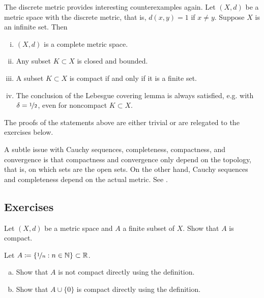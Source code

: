 \begin{example}
The discrete metric provides interesting counterexamples again.
Let $(X,d)$ be a metric space with the discrete metric, that is, $d(x,y) = 1$
if $x \neq y$.  Suppose
$X$ is an infinite set.  Then
\begin{enumerate}[(i)]
\item $(X,d)$ is a complete metric space.
\item Any subset $K \subset X$ is closed and bounded.
\item A subset $K \subset X$ is compact if and only if it is a finite set.
\item The conclusion of the Lebesgue covering lemma is always satisfied,
e.g. with $\delta = \nicefrac{1}{2}$,
even for noncompact $K \subset X$.
\end{enumerate}
The proofs
of the statements above are either trivial or are relegated to the exercises
below.
\end{example}

\begin{remark}
A subtle issue with Cauchy sequences, completeness, compactness,
and convergence is that compactness and convergence only depend on the
topology, that is, on which sets are the open sets.  On the other hand,
Cauchy sequences and completeness depend on the actual metric.
See .
\end{remark}

\subsection{Exercises}

\begin{exercise}
Let $(X,d)$ be a metric space and $A$ a finite subset of $X$.
Show that $A$ is compact.
\end{exercise}

\begin{samepage}
\begin{exercise}
Let $A \coloneqq \{ \nicefrac{1}{n} : n \in {\mathbb{N}} \} \subset {\mathbb{R}}$.
\begin{enumerate}[a)]
\item
Show that $A$ is
not compact directly using the definition.
\item
Show that $A \cup \{ 0 \}$ is
compact directly using the definition.
\end{enumerate}
\end{exercise}
\end{samepage}


